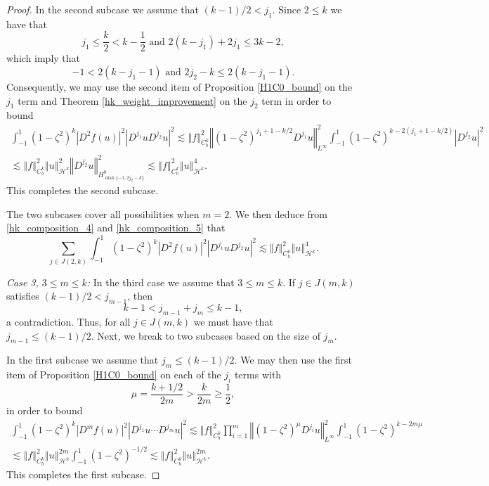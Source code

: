 \documentclass[11pt,reqno]{amsart}
\numberwithin{equation}{section}
\providecommand{\abs}[1]{\left\vert#1\right\vert}
\providecommand{\norm}[1]{\left\Vert#1\right\Vert}
\def\hal{\frac{1}{2}}
\def\ls{\lesssim}
\providecommand{\abs}[1]{\left\vert#1\right\vert}
\providecommand{\norm}[1]{\left\Vert#1\right\Vert}
\def\hal{\frac{1}{2}}
\def\ls{\lesssim}
\def\h{\mathcal{H}}
\begin{document}
\begin{proof}
In the second subcase we assume that $(k-1)/2 < j_1$.   Since $2 \le k$ we have that 
\begin{equation}
 j_1 \le \frac{k}{2} < k - \hal \text{ and }  2(k-j_1) +2j_1 \le 3k-2,
\end{equation}
which imply that
\begin{equation}
 -1 < 2(k-j_1-1) \text{ and } 2j_2 -k \le  2(k-j_1-1).
\end{equation}
Consequently, we may use the second item of Proposition \ref{H1C0_bound} on the $j_1$ term and 
Theorem \ref{hk_weight_improvement} on the $j_2$ term in order to bound  
\begin{multline}\label{hk_composition_5}
 \int_{-1}^1 (1-\zeta^2)^k \abs{D^2 f(u)}^2 \abs{D^{j_1} u  D^{j_2} u }^2 \ls \norm{f}_{C^k_b}^2 \norm{(1-\zeta^2)^{j_1+1-k/2} D^{j_1} u}_{L^\infty}^2   \int_{-1}^1 (1-\zeta^2)^{k-2(j_1+1-k/2)} \abs{D^{j_2} u }^2  \\
 \ls  \norm{f}_{C^k_b}^2 \norm{u}_{\h^k}^2 \norm{D^{j_2} u}_{H^0_{\max\{-1,2 j_2 -k\}}}^2  \ls  \norm{f}_{C^k_b}^2 \norm{u}_{\h^k}^4.
\end{multline} 
This completes the second subcase.

The two subcases cover all possibilities when $m=2$.  We then deduce from \eqref{hk_composition_4} and \eqref{hk_composition_5} that 
\begin{equation}\label{hk_composition_6}
\sum_{j \in J(2,k)} \int_{-1}^1 (1-\zeta^2)^k \abs{D^2f(u)}^2 \abs{D^{j_1} u  D^{j_2} u }^2 \ls \norm{f}_{C^k_b}^2 \norm{u}_{\h^k}^4.
\end{equation}


\emph{Case 3,  $3 \le m \le k$:}  In the third case we assume that $3 \le m \le k$.  If $j \in J(m,k)$ satisfies $(k-1)/2 < j_{m-1}$, then 
\begin{equation}
 k-1 < j_{m-1} + j_m \le k-1,
\end{equation}
a contradiction.  Thus, for all $j \in J(m,k)$ we must have that $j_{m-1} \le (k-1)/2$.  Next, we break to two subcases based on the size of $j_m$.

In the first subcase we assume that $j_m \le (k-1)/2$.  We may then use the first item of Proposition \ref{H1C0_bound} on each of the $j_i$ terms with 
\begin{equation}
 \mu = \frac{k+1/2}{2m} > \frac{k}{2m} \ge \hal,
\end{equation}
in order to bound 
\begin{multline}\label{hk_composition_7}
 \int_{-1}^1 (1-\zeta^2)^k \abs{D^mf(u)}^2 \abs{D^{j_1} u \cdots D^{j_m} u }^2 \ls \norm{f}_{C^k_b}^2 \prod_{i=1}^m  \norm{(1-\zeta^2)^{\mu} D^{j_i} u}_{L^\infty}^2  
 \int_{-1}^1 (1-\zeta^2)^{k-2m\mu}  \\
 \ls  \norm{f}_{C^k_b}^2 \norm{u}_{\h^k}^{2m} \int_{-1}^1 (1-\zeta^2)^{-1/2} \ls   \norm{f}_{C^k_b}^2 \norm{u}_{\h^k}^{2m}.
\end{multline}
This completes the first subcase.



\end{proof}
\end{document}
